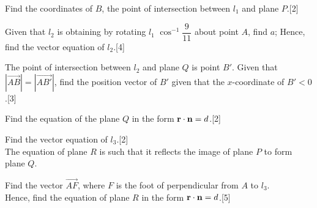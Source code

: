 \documentclass[12pt, a4 paper]{article}
\begin{document}
\begin{outline}[enumerate]
	\2 Find the coordinates of $B$, the point of intersection between ${l_1}$ and plane $P$.\hfill[2]

	\2 Given that ${l_2}$ is obtaining by rotating ${l_1}$ ${\cos ^{ - 1}}\dfrac{9}{{11}}$ about point $A$, find $a$; Hence, find the vector equation of ${l_2}$.\hfill[4]

	\2 	The point of intersection between ${l_2}$ and plane $Q$ is point $B'$. Given that $\left| {\overrightarrow {AB} } \right| = \left| {\overrightarrow {AB'} } \right|$, find the position vector of $B'$ given that the $x$-coordinate of $B' < 0$.\hfill[3]

	\2	Find the equation of the plane $Q$ in the form ${\bf{r}} \cdot {\bf{n}} = d$.\hfill[2]

	\2	Find the vector equation of ${l_3}$.\hfill[2]\\

	The equation of plane $R$ is such that it reflects the image of plane $P$ to form plane $Q$.

	\2	Find the vector $\overrightarrow {AF} $, where $F$ is the foot of perpendicular from $A$ to ${l_3}$. \\
	Hence, find the equation of plane $R$ in the form ${\bf{r}} \cdot {\bf{n}} = d$.\hfill[5]

\end{outline}
\end{document}
